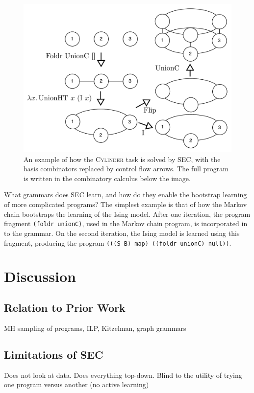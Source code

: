 \documentclass{article} %
\begin{document}
\begin{figure}
\includegraphics[width=.5\linewidth]{./figures/cylinder.pdf}
\caption{An example of how the \textsc{Cylinder} task is solved by SEC, with the basis combinators replaced by control flow arrows. The full program is written in the combinatory calculus below the image. \label{ref:cylinder}}
\end{figure}

What grammars does SEC learn, and how do they enable the bootstrap learning of more complicated programs?
The simplest example is that of how the Markov chain bootstraps the learning of the Ising model.
After one iteration, the program fragment \verb|(foldr unionC)|, used in the Markov chain program, is incorporated in to the grammar.
On the second iteration, the Ising model is learned using this fragment, producing the program \verb|(((S B) map) ((foldr unionC) null))|.

\section{Discussion}

\subsection{Relation to Prior Work}

MH sampling of programs, ILP, Kitzelman, graph grammars

\subsection{Limitations of SEC}

Does not look at data. Does everything top-down. Blind to the utility of trying one program versus another (no active learning)



\end{document}
